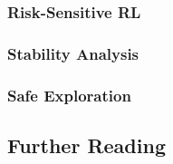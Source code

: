 \subsubsection{Risk-Sensitive RL}


\subsubsection{Stability Analysis}


\subsubsection{Safe Exploration}



\subsection{Further Reading}